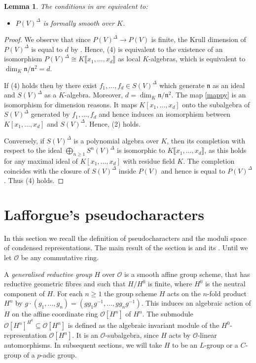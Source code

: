 \documentclass{amsart}
\newtheorem{lem}[prop]{Lemma}
\theoremstyle{definition}
\theoremstyle{remark}
\newcommand{\OO}{\mathcal O}
\newcommand{\nn}{\mathfrak n}
\newcommand{\br}[1]{\llbracket #1\rrbracket}
\begin{document}
\begin{lem}\label{main_todd} The conditions in  are equivalent to: 
\begin{itemize}
\item[(4)] $P(V)^{\Delta}$ is formally smooth over $K$. 
\end{itemize}
\end{lem}
\begin{proof} We observe that since 
$P(V)^{\Delta}\rightarrow P(V)$ is finite, the Krull 
dimension of $P(V)^{\Delta}$ is 
equal to $d$ by \cite[Corollary A.8]{BH}. Hence, 
 (4) is equivalent to the existence
of an isomorphism $P(V)^{\Delta}\cong K\br{x_1, \ldots, x_d}$ as local $K$-algebras, which is equivalent to $\dim_K \nn/\nn^2=d$. 

If (4) holds then by  there
exist $f_1,\ldots, f_d\in S(V)^{\Delta}$
which generate $\nn$ as an ideal and $S(V)^{\Delta}$ as a $K$-algebra. Moreover, $d=\dim_K \nn/\nn^2$.
The map \eqref{mappy} is an isomorphism 
for  dimension reasons. It maps $K[x_1,\ldots, x_d]$ onto the subalgebra 
of $S(V)^{\Delta}$ generated by $f_1,\ldots, f_d$ and hence induces an 
isomorphism between $K[x_1,\ldots, x_d]$
and $S(V)^{\Delta}$. Hence, (2) holds. 

Conversely, if $S(V)^{\Delta}$ is a polynomial algebra over $K$, then its completion with respect to the ideal $\bigoplus_{n\ge 1} S^n (V)^{\Delta}$ is isomorphic to 
$K\br{x_1,\ldots, x_d}$, as this holds for any maximal ideal 
of $K[x_1,\ldots, x_d]$ with residue field $K$. The completion coincides with the 
closure of $S(V)^{\Delta}$ inside $P(V)$ and hence is equal to $P(V)^{\Delta}$. Thus (4) holds. 
\end{proof}

\section{Lafforgue's pseudocharacters}\label{laf}

In this section we recall the definition of pseudocharacters and the moduli space of condensed representations. The main result of the section is  and its . Until   we let $\OO$ be any commutative ring.



A \emph{generalised reductive group} $H$ over $\OO$ is a 
smooth affine group scheme, that has reductive geometric fibres and such that $H/H^0$ is finite, where $H^0$ is the neutral component of $H$. For each $n\ge 1$ the group scheme $H$ acts on the $n$-fold product $H^n$ by $g \cdot (g_1, \dots, g_n) = (gg_1g^{-1}, \dots, gg_ng^{-1})$. This induces an algebraic action of $H$ on the affine coordinate ring $\OO[H^n]$ of $H^n$. The submodule $\OO[H^n]^{H^0} \subseteq \OO[H^n]$ is defined as the algebraic invariant module of the $H^0$-representation $\OO[H^n]$. It is an $\OO$-subalgebra, since $H$ acts by $\OO$-linear automorphisms.
In subsequent sections, we will take $H$ to be an $L$-group or a $C$-group of a $p$-adic group.
\end{document}
